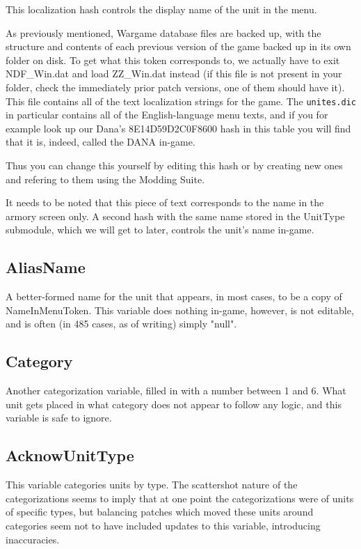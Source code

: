 \documentclass{article}
\begin{document}
This localization hash controls the display name of the unit in the menu.

As previously mentioned, Wargame database files are backed up, with the structure and contents of each previous version of the game backed up in its own folder on disk. To get what this token corresponds to, we actually have to exit NDF\_Win.dat and load ZZ\_Win.dat instead (if this file is not present in your folder, check the immediately prior patch versions, one of them should have it). This file contains all of the text localization strings for the game. The \texttt{unites.dic} in particular contains all of the English-language menu texts, and if you for example look up our Dana's 8E14D59D2C0F8600 hash in this table you will find that it is, indeed, called the DANA in-game.

Thus you can change this yourself by editing this hash or by creating new ones and refering to them using the Modding Suite.

It needs to be noted that this piece of text corresponds to the name in the armory screen only. A second hash with the same name stored in the UnitType submodule, which we will get to later, controls the unit's name in-game.

\subsection{AliasName}

A better-formed name for the unit that appears, in most cases, to be a copy of NameInMenuToken. This variable does nothing in-game, however, is not editable, and is often (in 485 cases, as of writing) simply "null".

\subsection{Category}

Another categorization variable, filled in with a number between 1 and 6. What unit gets placed in what category does not appear to follow any logic, and this variable is safe to ignore.

\subsection{AcknowUnitType}

This variable categories units by type. The scattershot nature of the categorizations seems to imply that at one point the categorizations were of units of specific types, but balancing patches which moved these units around categories seem not to have included updates to this variable, introducing inaccuracies.
\end{document}
